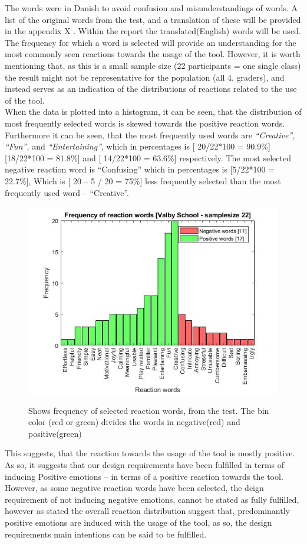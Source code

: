 The words were in Danish to avoid confusion and misunderstandings of words.  A list of the original words from the test, and a translation of these will be provided in the appendix X . Within the report the translated(English) words will be used. 
The frequency for which a word is selected will provide an understanding for the most commonly seen reactions towards the usage of the tool. However, it is worth mentioning that, as this is a small sample size (22 participants = one single class) the result might not be representative for the population (all 4. graders), and instead serves as an indication of the distributions of reactions related to the use of the tool. 
\newline
\\
When the data is plotted into a histogram, it can be seen, that the distribution of most frequently selected words is skewed towards the positive reaction words. Furthermore it can be seen, that the most frequently used words are  \textit{“Creative”, “Fun”,} and \textit{“Entertaining”}, which in percentages is [ 20/22*100  = 90.9\%][18/22*100 = 81.8\%] and [ 14/22*100 = 63.6\%] respectively. The most selected negative reaction word is “Confusing” which in percentages is [5/22*100 = 22.7\%], Which is [ 20 – 5 / 20 = 75\%] less frequently selected than the most frequently used word – “Creative”. 



\begin{figure}[H]
	\centering
	\includegraphics[width=0.7\linewidth]{figure/Evaluation/histValby.jpg}
	\label{fig:valbyTest}
	\caption{Shows frequency of selected reaction words, from the test. The bin color (red or green) divides the words in negative(red) and positive(green) }
		
\end{figure}

This suggests, that the reaction towards the usage of the tool is mostly positive.  As so, it suggests that our design requirements have been fulfilled in terms of inducing Positive emotions – in terms of a positive reaction towards the tool. However, as some negative reaction words have been selected, the deign requirement of not inducing negative emotions, cannot be stated as fully fulfilled, however as stated the overall reaction distribution suggest that, predominantly positive emotions are induced with the usage of the tool, as so, the design requirements main intentions can be said to be fulfilled. 

